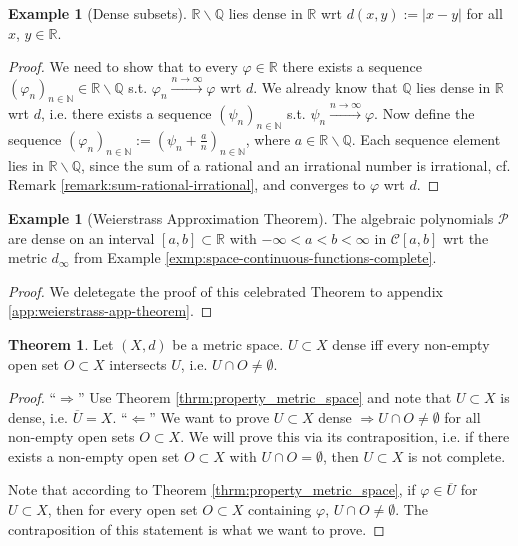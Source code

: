 \documentclass[12pt, a4paper]{article}
\numberwithin{equation}{section}
\theoremstyle{definition}
\theoremstyle{definition}
\newtheorem{exmp}[thm]{Example} %
\newtheorem{theorem}[thm]{Theorem}
\newcommand{\abs}[1]{\left\vert #1 \right\vert}
\newcommand{\seq}[1][\varphi]{\left( #1 \right)_{n \in \mathbb{N}}}
\begin{document}
	\begin{exmp}[Dense subsets]
		$\mathbb R\backslash \mathbb Q$ lies dense in $\mathbb R$ wrt $d(x, y) := \abs{x - y}$ for all $x$, $y\in\mathbb R$.
	\end{exmp}

	\begin{proof}
		We need to show that to every $\varphi\in \mathbb R$ there exists a sequence $\left(\varphi_n\right)_{n\in\mathbb N}\in \mathbb R\backslash \mathbb Q$ s.t. $\varphi_n\overset{n\to\infty}{\longrightarrow}\varphi$ wrt $d$. We already know that $\mathbb Q$ lies dense in $\mathbb R$ wrt $d$, i.e. there exists a sequence $\left(\psi_n\right)_{n\in\mathbb N}$ s.t. $\psi_n\overset{n\to\infty}{\longrightarrow}\varphi$. Now define the sequence $\seq[\varphi_n] := \seq[\psi_n + \frac{a}{n}]$, where $a\in\mathbb R\backslash \mathbb Q$. Each sequence element lies in $\mathbb R\backslash \mathbb Q$, since the sum of a rational and an irrational number is irrational, cf. Remark \ref{remark:sum-rational-irrational}, and converges to $\varphi$ wrt $d$.
	\end{proof}

	\begin{exmp}[Weierstrass Approximation Theorem]\label{exmp:weierstrass-approx-thrm}
		The algebraic polynomials $\mathcal P$ are dense on an interval $[a, b]\subset \mathbb R$ with $-\infty < a < b < \infty$ in $\mathcal C[a, b]$ wrt the metric $d_{\infty}$ from Example \ref{exmp:space-continuous-functions-complete}. \cite[Corollary 6.12]{iske:approximation}
	\end{exmp}

	\begin{proof}
		We deletegate the proof of this celebrated Theorem to appendix \ref{app:weierstrass-app-theorem}. 
	\end{proof}

	\begin{theorem}\label{thrm:characterization-dense-subsets}
		Let $(X, d)$ be a metric space. $U\subset X$ dense iff every non-empty open set $O\subset X$ intersects $U$, i.e. $U\cap O\ne\emptyset$.
	\end{theorem}

	\begin{proof}
		\enquote{$\Longrightarrow$} Use Theorem \ref{thrm:property_metric_space} and note that $U\subset X$ is dense, i.e. $\overline{U} = X$.
		\newline\newline\enquote{$\Longleftarrow$} We want to prove $U\subset X$ dense $\Rightarrow U\cap O\ne\emptyset$ for all non-empty open sets $O\subset X$. We will prove this via its contraposition, i.e. if there exists a non-empty open set $O\subset X$ with $U\cap O=\emptyset$, then $U\subset X$ is not complete.
		
		Note that according to Theorem \ref{thrm:property_metric_space}, if $\varphi\in\overline{U}$ for $U\subset X$, then for every open set $O\subset X$ containing $\varphi$, $U\cap O\ne\emptyset$. The contraposition of this statement is what we want to prove.
	\end{proof}
\end{document}
